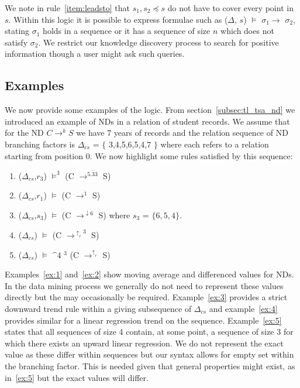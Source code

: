 We note in rule~\ref{item:leadsto} that $s_1,s_2 \preceq 
s$ do not have to cover every point in $s$.
Within this logic it is possible to express formulae such as
($\Delta$, $s$) $\models$ $\sigma_1
\to$  $\sigma_2$, stating $\sigma_1$ holds in a sequence or
it has a sequence of size $n$ which does not satisfy
$\sigma_2$. We restrict our knowledge discovery process to
search for positive information though a user might ask such queries.

\subsection{Examples}

We now provide some examples of the logic. From
section~\ref{subsec:tl_tsa_nd} we introduced an example of NDs in a relation
of student records. We assume that for the ND $C \to^k S$ we have 7
years of records and the relation sequence of ND branching factors is
$\Delta_{cs}$ = $\{$ 3,4,5,6,5,4,7 $\}$ where each refers to a
relation starting from 
position 0. We now highlight some rules satisfied by this sequence:

\begin{enumerate}
\item\label{ex:1} ($\Delta_{cs}$,$r_3$) $\models^3$ (C $\to^{\bar{5.33}}$ S)
\item\label{ex:2} ($\Delta_{cs}$,$r_1$) $\models$ (C $\to^{\ddot{1}}$ S)
\item\label{ex:3} ($\Delta_{cs}$,$s_3$) $\models$ (C
$\to^{\downarrow{6}}$ S) where $s_3$ = $\{ 6,5,4 \}$.
\item\label{ex:4} ($\Delta_{cs}$) $\models$ (C $\to^{\uparrow_r{3}}$ S)
\item\label{ex:5} ($\Delta_{cs}$) $\models$ $\bm^4$ \diam$^3$ (C
$\to^{\uparrow_r}$ S)
\end{enumerate}

Examples~\ref{ex:1} and~\ref{ex:2} show moving average and differenced
values for NDs. In the data mining process we generally do not need to
represent these values directly but the may occasionally be
required. Example~\ref{ex:3} provides a strict downward trend rule
within a giving subsequence of $\Delta_{cs}$ and example~\ref{ex:4}
provides similar for a linear regression trend on the
sequence. Example~\ref{ex:5} states that all sequences of size 4
contain, at some point, a sequence of size 3 for which there exists an
upward linear regression. We do not represent the exact value as these
differ within sequences but our syntax allows for empty set within the
branching factor. This is needed given that general properties might
exist, as in~\ref{ex:5} but the exact values will differ.

